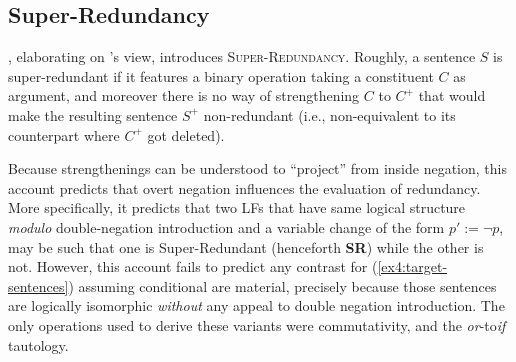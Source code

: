 \subsection{Super-Redundancy}

\textcite{Kalomoiros2024}, elaborating on \textcite{Katzir2014}'s view, introduces \textsc{Super-Redundancy}. Roughly, a sentence $S$ is super-redundant if it features a binary operation taking a constituent $C$ as argument, and moreover there is no way of strengthening $C$ to $C^+$ that would make the resulting sentence $S^+$ non-redundant (i.e., non-equivalent to its counterpart where $C^+$ got deleted).

\begin{exe}
	\label{ex4:sr}
\end{exe}

Because strengthenings can be understood to ``project'' from inside negation, this account predicts that overt negation influences the evaluation of redundancy. More specifically, it predicts that two LFs that have same logical structure \textit{modulo} double-negation introduction and a variable change of the form $p' := \neg p$, may be such that one is Super-Redundant (henceforth \textbf{SR}) while the other is not. However, this account fails to predict any contrast for (\ref{ex4:target-sentences}) assuming conditional are material, precisely because those sentences are logically isomorphic \textit{without} any appeal to double negation introduction. The only operations used to derive these variants were commutativity, and the \textit{or}-to\textit{if} tautology.\\

